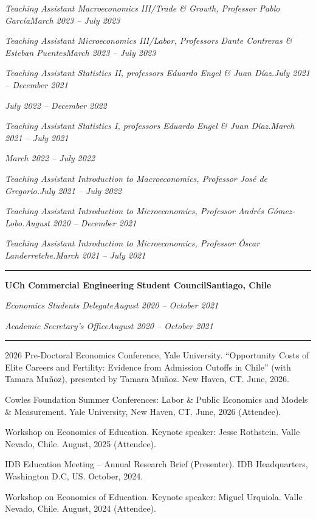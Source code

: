 \documentclass[11pt]{article}
\newcommand{\cvsection}[1]{\vspace{9pt}{\bfseries #1}\par\vspace{2pt}\hrule\vspace{6pt}}
\newcommand{\HL}[2]{\textbf{#1}\hfill\textbf{#2}\par}
\newcommand{\RL}[2]{\textit{#1}\hfill\textit{#2}\par}
\newcommand{\RR}[1]{\mbox{}\hfill\textit{#1}\par}
\newcommand{\gap}{\vspace{7pt}}
\begin{document}
\RL{Teaching Assistant Macroeconomics III/Trade \& Growth, Professor Pablo García}{March 2023 -- July 2023}
\gap

\RL{Teaching Assistant Microeconomics III/Labor, Professors Dante Contreras \& Esteban Puentes}{March 2023 -- July 2023}
\gap

\RL{Teaching Assistant Statistics II, professors Eduardo Engel \& Juan Díaz.}{July 2021 -- December 2021}
\RR{July 2022 -- December 2022}
\gap

\RL{Teaching Assistant Statistics I, professors Eduardo Engel \& Juan Díaz.}{March 2021 -- July 2021}
\RR{March 2022 -- July 2022}
\gap

\RL{Teaching Assistant Introduction to Macroeconomics, Professor José de Gregorio.}{July 2021 -- July 2022}
\gap

\RL{Teaching Assistant Introduction to Microeconomics, Professor Andrés Gómez-Lobo.}{August 2020 -- December 2021}
\gap

\RL{Teaching Assistant Introduction to Microeconomics, Professor Óscar Landerretche.}{March 2021 -- July 2021}

\cvsection{LEADERSHIP \& SERVICE}

\HL{UCh Commercial Engineering Student Council}{Santiago, Chile}
\RL{Economics Students Delegate}{August 2020 -- October 2021}
\gap

\RL{Academic Secretary's Office}{August 2020 -- October 2021}

\cvsection{CONFERENCES \& PRESENTATIONS}

2026 Pre-Doctoral Economics Conference, Yale University. ``Opportunity Costs of Elite Careers and Fertility: Evidence from Admission Cutoffs in Chile'' (with Tamara Muñoz), presented by Tamara Muñoz. New Haven, CT. June, 2026.
\gap

Cowles Foundation Summer Conferences: Labor \& Public Economics and Models \& Measurement. Yale University, New Haven, CT. June, 2026 (Attendee).
\gap

Workshop on Economics of Education. Keynote speaker: Jesse Rothstein. Valle Nevado, Chile. August, 2025 (Attendee).
\gap

IDB Education Meeting -- Annual Research Brief (Presenter). IDB Headquarters, Washington D.C, US. October, 2024.
\gap

Workshop on Economics of Education. Keynote speaker: Miguel Urquiola. Valle Nevado, Chile. August, 2024 (Attendee).
\end{document}
